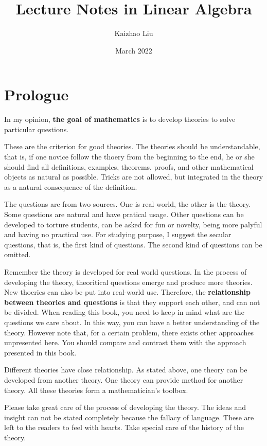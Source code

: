 \documentclass{book}
\title{Lecture Notes in Linear Algebra}
\author{Kaizhao Liu}
\date{March 2022}
\theoremstyle{definition}
\begin{document}
\maketitle
\tableofcontents
\section{Prologue}
In my opinion, \textbf{the goal of mathematics} is to develop theories to solve particular questions. \par
These are the criterion for good theories. The theories should be understandable, that is, if one novice follow the thoery from the beginning to the end, he or she should find all definitions, examples, theorems, proofs, and other mathematical objects as natural as possible. Tricks are not allowed, but integrated in the theory as a natural consequence of the definition. \par
The questions are from two sources. One is real world, the other is the theory. Some questions are natural and have pratical usage. Other questions can be developed to torture students, can be asked for fun or novelty, being more palyful and having no practical use. For studying purpose, I suggest the secular questions, that is, the first kind of questions. The second kind of questions can be omitted.\par
Remember the theory is developed for real world questions. In the process of developing the theory, theoritical questions emerge and produce more theories. New thoeries can also be put into real-world use. Therefore, the \textbf{relationship between theories and questions} is that they support each other, and can not be divided. When reading this book, you need to keep in mind what are the questions we care about. In this way, you can have a better understanding of the theory. However note that, for a certain problem, there exists other approaches unpresented here. You should compare and contrast them with the approach presented in this book.\par
Different theories have close relationship. As stated above, one theory can be developed from another theory. One theory can provide method for another theory. All these theories form a mathematician's toolbox.\par
Please take great care of the process of developing the theory. The ideas and insight can not be stated completely because the fallacy of language. These are left to the readers to feel with hearts. Take special care of the history of the theory. \par
\end{document}
